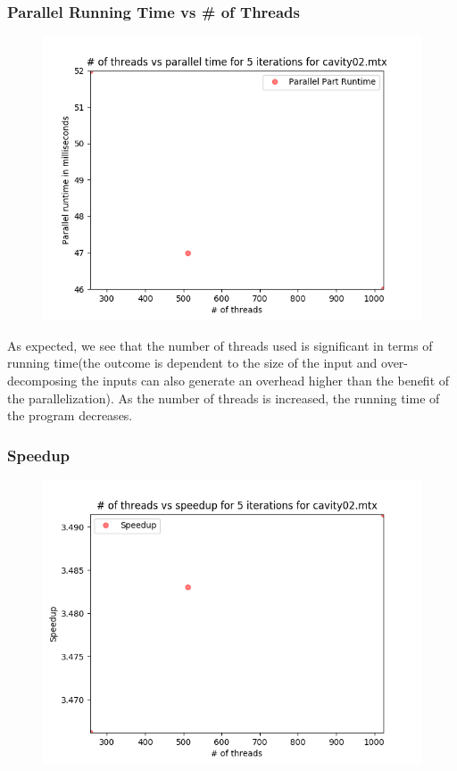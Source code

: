 \documentclass{article}
\begin{document}
\subsubsection{Parallel Running Time vs # of Threads}

\begin{figure}[H]
\centering
\includegraphics[width=\linewidth]{assets/cavity_thr_parallel.png}
\label{fig:test1}
\vspace{-2pt}
\end{figure}

\null \qquad As expected, we see that the number of threads used is significant in terms of running time(the outcome is dependent to the size of the input and over-decomposing the inputs can also generate an overhead higher than the benefit of the parallelization). As the number of threads is increased, the running time of the program decreases.

\subsubsection{Speedup}

\begin{figure}[H]
\centering
\includegraphics[width=\linewidth]{assets/cavity_thr_speedup.png}
\label{fig:test1}
\vspace{-2pt}
\end{figure}
\end{document}
